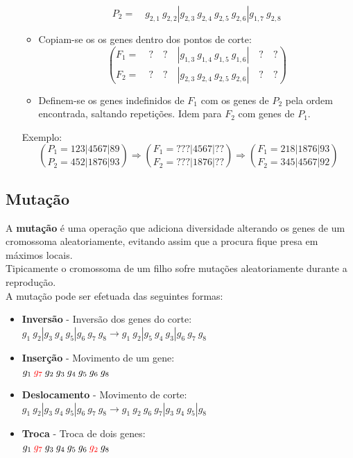 \documentclass[]{report}
\begin{document}
\begin{itemize}
\begin{itemize}
$$		{P_2 = \quad g_{2,1} \> g_{2,2} | g_{2,3} \> g_{2,4} \> g_{2,5} \> g_{2,6} | g_{1,7} \> g_{2,8}}
		$$
		\item Copiam-se os os genes dentro dos pontos de corte:
		$$
		\binom{F_1 = \quad ? \quad ?  \quad | g_{1,3} \> g_{1,4} \> g_{1,5} \> g_{1,6} | \quad ? \quad ?}
		{F_2 = \quad ? \quad ?  \quad | g_{2,3} \> g_{2,4} \> g_{2,5} \> g_{2,6} | \quad ? \quad ?}$$
		\item Definem-se os genes indefinidos de $F_1$ com os genes de $P_2$ pela ordem encontrada, saltando repetições. Idem para $F_2$ com genes de $P_1$.
	\end{itemize}
	Exemplo:
	$$
	\binom{P_1 = 1 2 3 | 4 5 6 7 | 8 9}
	{P_2 = 4 5 2 | 1 8 7 6 | 9 3}
	\Rightarrow
	\binom{F_1 = ? ? ? | 4 5 6 7 | ? ?}
	{F_2 = ? ? ? | 1 8 7 6 | ? ?}
	\Rightarrow
	\binom{F_1 = 2 1 8 | 1 8 7 6 | 9 3}
	{F_2 = 3 4 5 | 4 5 6 7 | 9 2}
	$$
\end{itemize}
\subsection{Mutação}
A \textbf{mutação} é uma operação que adiciona diversidade alterando os genes de um cromossoma aleatoriamente, evitando assim que a procura fique presa em máximos locais.\\
Tipicamente o cromossoma de um filho sofre mutações aleatoriamente durante a reprodução.\\
A mutação pode ser efetuada das seguintes formas:
\begin{itemize}
	\item \textbf{Inversão} - Inversão dos genes do corte:\\
	$g_{1} \> g_{2} | g_{3} \> g_{4} \> g_{5} | g_{6} \> g_{7} \> g_{8} \to
	g_{1} \> g_{2} | g_{5} \> g_{4} \> g_{3} | g_{6} \> g_{7} \> g_{8}$
	\item \textbf{Inserção} - Movimento de um gene:\\
	$g_{1} \> \textcolor{red}{g_{7}} \> g_{2} \> g_{3} \> g_{4} \> g_{5} \> g_{6} \> g_{8}$
	\item \textbf{Deslocamento} - Movimento de corte:\\
	$g_{1} \> g_{2} | g_{3} \> g_{4} \> g_{5} | g_{6} \> g_{7} \> g_{8} \to
	g_{1} \> g_{2} \> g_{6} \> g_{7} | g_{3} \> g_{4} \> g_{5} | g_{8}$
	\item \textbf{Troca} - Troca de dois genes:\\
	$g_{1} \> \textcolor{red}{g_{7}} \> g_{3} \> g_{4} \> g_{5} \> g_{6} \> \textcolor{red}{g_{2}} \> g_{8}$
\end{itemize}
\end{document}
